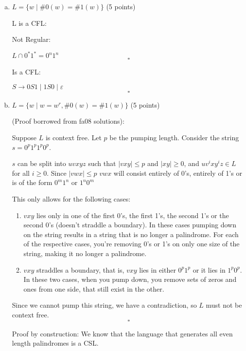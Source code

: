 \documentclass{article}
\begin{document}
            \begin{enumerate}[(a)]
            \item $L = \{w \;|\; \#0(w)=\#1(w)\}$ (5 points)

            L is a CFL:

            Not Regular:

            $L \cap {0^*1^*} = 0^n1^n$
            \[ \square \]

            Is a CFL:

            $S \rightarrow 0S1 \;|\; 1S0 \;|\; \varepsilon$
            \[ \square \]

            \item $L = \{w \;|\; w=w^r, \#0(w)=\#1(w)\}$ (5 points)

(Proof borrowed from fa08 solutions):

Suppose $L$ is context free. Let $p$ be the pumping length. Consider the string
$s = 0^p1^p1^p0^p$.

$s$ can be split into $uvxyz$ such that $|vxy| \leq p$ and $|xy| \geq 0$, and
$uv^ixy^iz \in L$ for all $i \geq 0$. Since $|vwx| \leq p$ $vwx$ will consist
entirely of 0's, entirely of 1's or is of the form $0^m1^n$ or $1^n0^m$

This only allows for the following cases:

\begin{enumerate}[{Case} 1:]

    \item $vxy$ lies only in one of the first 0's, the first 1's, the second 1's
    or the second 0's (doesn't straddle a boundary). In these cases pumping down
    on the string results in a string that is no longer a palindrome. For each
    of the respective cases, you're removing 0's or 1's on only one size of the
    string, making it no longer a palindrome.

    \item $vxy$ straddles a boundary, that is, $vxy$ lies in either $0^p1^p$ or
    it lies in $1^p0^p$. In these two cases, when you pump down, you remove sets
    of zeros and ones from one side, that still exist in the other.

\end{enumerate}

Since we cannot pump this string, we have a contradiction, so $L$ must not be
context free.
\[ \square \]

Proof by construction:
We know that the language that generates all even length palindromes is a CSL.


\end{enumerate}
\end{document}
